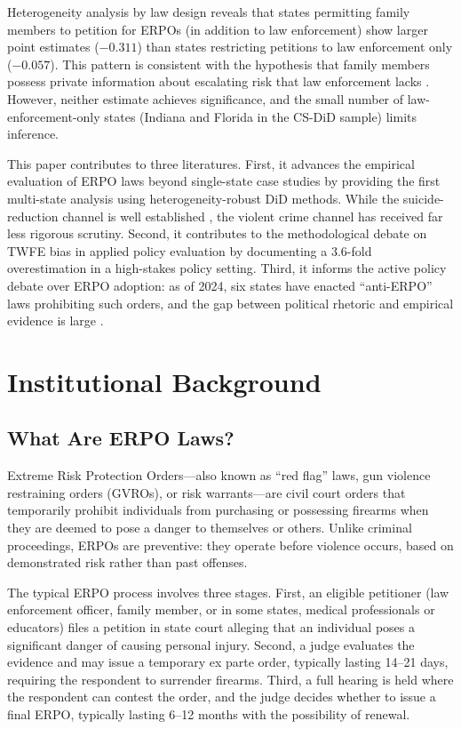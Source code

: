 \documentclass[12pt]{article}
\begin{document}
Heterogeneity analysis by law design reveals that states permitting family members to petition for ERPOs (in addition to law enforcement) show larger point estimates ($-0.311$) than states restricting petitions to law enforcement only ($-0.057$). This pattern is consistent with the hypothesis that family members possess private information about escalating risk that law enforcement lacks \citep{wintemute2019extreme, webster2020erpo}. However, neither estimate achieves significance, and the small number of law-enforcement-only states (Indiana and Florida in the CS-DiD sample) limits inference.

This paper contributes to three literatures. First, it advances the empirical evaluation of ERPO laws beyond single-state case studies by providing the first multi-state analysis using heterogeneity-robust DiD methods. While the suicide-reduction channel is well established \citep{kivisto2015effects, deangelis2023red}, the violent crime channel has received far less rigorous scrutiny. Second, it contributes to the methodological debate on TWFE bias in applied policy evaluation \citep{goodman2021difference, roth2023pretest, borusyak2024revisiting} by documenting a 3.6-fold overestimation in a high-stakes policy setting. Third, it informs the active policy debate over ERPO adoption: as of 2024, six states have enacted ``anti-ERPO'' laws prohibiting such orders, and the gap between political rhetoric and empirical evidence is large \citep{luca2020impact}.


\section{Institutional Background}

\subsection{What Are ERPO Laws?}

Extreme Risk Protection Orders---also known as ``red flag'' laws, gun violence restraining orders (GVROs), or risk warrants---are civil court orders that temporarily prohibit individuals from purchasing or possessing firearms when they are deemed to pose a danger to themselves or others. Unlike criminal proceedings, ERPOs are preventive: they operate before violence occurs, based on demonstrated risk rather than past offenses.

The typical ERPO process involves three stages. First, an eligible petitioner (law enforcement officer, family member, or in some states, medical professionals or educators) files a petition in state court alleging that an individual poses a significant danger of causing personal injury. Second, a judge evaluates the evidence and may issue a temporary ex parte order, typically lasting 14--21 days, requiring the respondent to surrender firearms. Third, a full hearing is held where the respondent can contest the order, and the judge decides whether to issue a final ERPO, typically lasting 6--12 months with the possibility of renewal.
\end{document}
